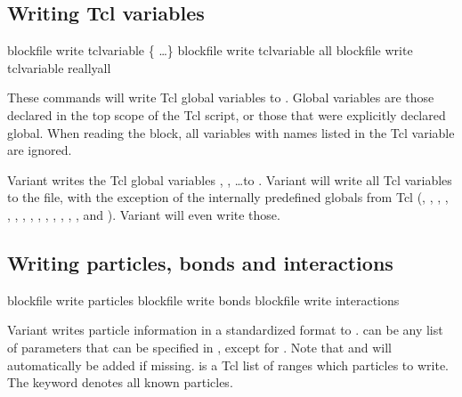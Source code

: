 \subsection{Writing Tcl variables}

\begin{essyntax}
   blockfile  write tclvariable \{
    \dots \}
   blockfile  write tclvariable all
   blockfile  write tclvariable reallyall
\end{essyntax}

These commands will write Tcl global variables to .
Global variables are those declared in the top scope of the Tcl
script, or those that were explicitly declared global.  When reading
the block, all variables with names listed in the Tcl variable
 are ignored.

Variant  writes the Tcl global variables ,
, \dots to . Variant  will write
all Tcl variables to the file, with the exception of the internally
predefined globals from Tcl (, ,
, , , ,
, , , ,
, , , ,
 and ). Variant  will
even write those.

\subsection{Writing particles, bonds and interactions}
\begin{essyntax}
   blockfile  write particles 
   
   blockfile  write bonds 
   blockfile  write interactions
\end{essyntax}

  Variant  writes
particle information in a standardized format to .
 can be any list of parameters that can be specified in
, except for .  Note that
 and  will automatically be added if missing.
 is a Tcl list of ranges which particles to write.  The
keyword  denotes all known particles.

